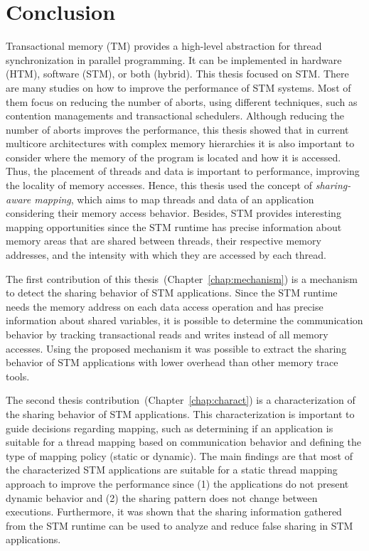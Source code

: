 \chapter{Conclusion}\label{chap:conclusion}

Transactional memory (TM) provides a high-level abstraction for thread synchronization in parallel programming. It can be implemented in hardware (HTM), software (STM), or both (hybrid). This thesis focused on STM. There are many studies on how to improve the performance of STM systems. Most of them focus on reducing the number of aborts, using different techniques, such as contention managements and transactional schedulers. Although reducing the number of aborts improves the performance, this thesis showed that in current multicore architectures with complex memory hierarchies it is also important to consider where the memory of the program is located and how it is accessed. Thus, the placement of threads and data is important to performance, improving the locality of memory accesses. Hence, this thesis used the concept of \emph{sharing-aware mapping}, which aims to map threads and data of an application considering their memory access behavior. Besides, STM provides interesting mapping opportunities since the STM runtime has precise information about memory areas that are shared between threads, their respective memory addresses, and the intensity with which they are accessed by each thread.

The first contribution of this thesis~(Chapter~\ref{chap:mechanism}) is a mechanism to detect the sharing behavior of STM applications. Since the STM runtime needs the memory address on each data access operation and has precise information about shared variables, it is possible to determine the communication behavior by tracking transactional reads and writes instead of all memory accesses. Using the proposed mechanism it was possible to extract the sharing behavior of STM applications with lower overhead than other memory trace tools.

The second thesis contribution~(Chapter~\ref{chap:charact}) is a characterization of the sharing behavior of STM applications. This characterization is important to guide decisions regarding mapping, such as determining if an application is suitable for a thread mapping based on communication behavior and defining the type of mapping policy (static or dynamic). The main findings are that most of the characterized STM applications are suitable for a static thread mapping approach to improve the performance since (1) the applications do not present dynamic behavior and (2) the sharing pattern does not change between executions. Furthermore, it was shown that the sharing information gathered from the STM runtime can be used to analyze and reduce false sharing in STM applications.

